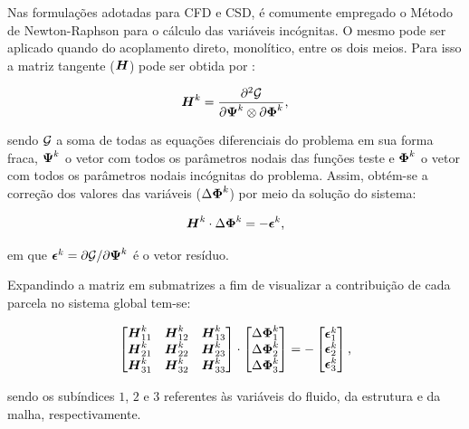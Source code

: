 Nas formulações adotadas para CFD e CSD, é comumente empregado o Método de Newton-Raphson para o cálculo das variáveis incógnitas. O mesmo pode ser aplicado quando do acoplamento direto, monolítico, entre os dois meios. Para isso a matriz tangente ($\boldsymbol{H}$) pode ser obtida por \cite{bazilevs2013computational,sanches2022metodos}:

\begin{equation}
    \boldsymbol{H}^k=\frac{\partial^2\mathcal{G}}{\partial\boldsymbol{\Psi}^k\otimes\partial\boldsymbol{\Phi}^k}\text{,}
\end{equation}

\noindent sendo $\mathcal{G}$ a soma de todas as equações diferenciais do problema em sua forma fraca, $\boldsymbol{\Psi}^k$ o vetor com todos os parâmetros nodais das funções teste e $\boldsymbol{\Phi}^k$ o vetor com todos os parâmetros nodais incógnitas do problema. Assim, obtém-se a correção dos valores das variáveis ($\Delta\boldsymbol{\Phi}^k$) por meio da solução do sistema:

\begin{equation}
    \boldsymbol{H}^k\cdot\Delta\boldsymbol{\Phi}^k=-\boldsymbol{\epsilon}^k\text{,}
\end{equation}

\noindent em que $\boldsymbol{\epsilon}^k=\partial\mathcal{G}/\partial\boldsymbol{\Psi}^k$ é o vetor resíduo.

Expandindo a matriz em submatrizes a fim de visualizar a contribuição de cada parcela no sistema global tem-se:

\begin{equation}
    \begin{bmatrix}
        \boldsymbol{H}_{11}^k & \boldsymbol{H}_{12}^k & \boldsymbol{H}_{13}^k \\
        \boldsymbol{H}_{21}^k & \boldsymbol{H}_{22}^k & \boldsymbol{H}_{23}^k \\
        \boldsymbol{H}_{31}^k & \boldsymbol{H}_{32}^k & \boldsymbol{H}_{33}^k
    \end{bmatrix}\cdot\begin{bmatrix}
        \Delta\boldsymbol{\Phi}_1^k \\\Delta\boldsymbol{\Phi}_2^k\\\Delta\boldsymbol{\Phi}_3^k
    \end{bmatrix}=-\begin{bmatrix}
        \boldsymbol{\epsilon}_1^k \\\boldsymbol{\epsilon}_2^k\\\boldsymbol{\epsilon}_3^k
    \end{bmatrix}\text{,}
\end{equation}

\noindent sendo os subíndices $1$, $2$ e $3$ referentes às variáveis do fluido, da estrutura e da malha, respectivamente.

